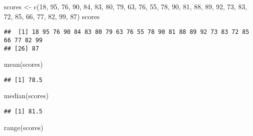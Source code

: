 \documentclass[
]{article}
\newenvironment{Shaded}{\begin{snugshade}}{\end{snugshade}}
\newcommand{\DecValTok}[1]{\textcolor[rgb]{0.00,0.00,0.81}{#1}}
\newcommand{\FunctionTok}[1]{\textcolor[rgb]{0.00,0.00,0.00}{#1}}
\newcommand{\NormalTok}[1]{#1}
\newcommand{\OtherTok}[1]{\textcolor[rgb]{0.56,0.35,0.01}{#1}}
\begin{document}
\begin{Shaded}
\begin{Highlighting}[]
\NormalTok{scores }\OtherTok{\textless{}{-}} \FunctionTok{c}\NormalTok{(}\DecValTok{18}\NormalTok{, }\DecValTok{95}\NormalTok{, }\DecValTok{76}\NormalTok{, }\DecValTok{90}\NormalTok{, }\DecValTok{84}\NormalTok{, }\DecValTok{83}\NormalTok{, }\DecValTok{80}\NormalTok{, }\DecValTok{79}\NormalTok{, }\DecValTok{63}\NormalTok{, }\DecValTok{76}\NormalTok{, }\DecValTok{55}\NormalTok{, }\DecValTok{78}\NormalTok{, }\DecValTok{90}\NormalTok{, }\DecValTok{81}\NormalTok{, }\DecValTok{88}\NormalTok{, }\DecValTok{89}\NormalTok{, }\DecValTok{92}\NormalTok{, }\DecValTok{73}\NormalTok{, }\DecValTok{83}\NormalTok{, }\DecValTok{72}\NormalTok{, }\DecValTok{85}\NormalTok{, }\DecValTok{66}\NormalTok{, }\DecValTok{77}\NormalTok{, }\DecValTok{82}\NormalTok{, }\DecValTok{99}\NormalTok{, }\DecValTok{87}\NormalTok{)}
\NormalTok{scores}
\end{Highlighting}
\end{Shaded}

\begin{verbatim}
##  [1] 18 95 76 90 84 83 80 79 63 76 55 78 90 81 88 89 92 73 83 72 85 66 77 82 99
## [26] 87
\end{verbatim}

\begin{Shaded}
\begin{Highlighting}[]
\FunctionTok{mean}\NormalTok{(scores)}
\end{Highlighting}
\end{Shaded}

\begin{verbatim}
## [1] 78.5
\end{verbatim}

\begin{Shaded}
\begin{Highlighting}[]
\FunctionTok{median}\NormalTok{(scores)}
\end{Highlighting}
\end{Shaded}

\begin{verbatim}
## [1] 81.5
\end{verbatim}

\begin{Shaded}
\begin{Highlighting}[]
\FunctionTok{range}\NormalTok{(scores)}
\end{Highlighting}
\end{Shaded}
\end{document}
